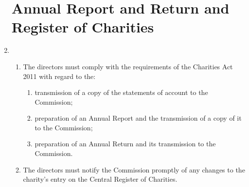 \documentclass{article}
\begin{document}
\begin{enumerate}[label=\arabic*, start=23]
    \section{Annual Report and Return and Register of Charities}
    \item \begin{enumerate}[label=(\arabic*)]
        \item The directors must comply with the requirements of the
        Charities Act 2011 with regard to the:
        \begin{enumerate}[label=(\alph*)]
            \item transmission of a copy of the statements of account to
            the Commission;
            \item preparation of an Annual Report and the transmission of a
            copy of it to the Commission;
            \item preparation of an Annual Return and its transmission to
            the Commission.
        \end{enumerate}
        \item The directors must notify the Commission promptly of
        any changes to the charity’s entry on the Central Register
        of Charities.
    \end{enumerate}
    

\end{enumerate}
\end{document}
